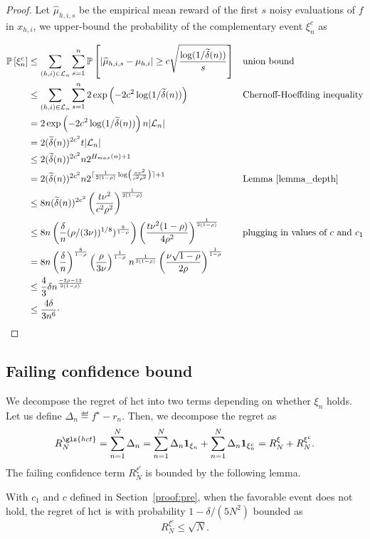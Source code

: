 \begin{proof}
Let $\hat{\mu}_{h,i,s}$ be the empirical mean reward of the first $s$ noisy evaluations of $f$ in $x_{h,i}$, we upper-bound the probability of the complementary event $\xi_n^c$ as

\begin{align*}
    \mathbb{P}\left[ \xi_n^c \right]
    & \leq \sum_{(h,i)\in\mathcal{L}_n}\sum_{s=1}^{n} \mathbb{P}\left[ |\widehat{\mu}_{h,i,s} - \mu_{h,i}| \geq c\sqrt{\frac{\log(1/\widetilde{\delta}(n))}{s}} \right] && \text{union bound} \\
    & \leq \sum_{(h,i)\in\mathcal{L}_n}\sum_{s=1}^{n} 2\operatorname{exp}\left( -2c^2\log(1/\widetilde{\delta}(n)) \right) && \text{Chernoff-Hoeffding inequality} \\
    & = 2\operatorname{exp}\left( -2c^2\log(1/\widetilde{\delta}(n)) \right) n|\mathcal{L}_n| \\
    & = 2(\widetilde{\delta}(n))^{2c^2}t|\mathcal{L}_n| \\
    & \leq 2(\widetilde{\delta}(n))^{2c^2}n 2^{H_{max}(n)+1} \\
    & = 2(\widetilde{\delta}(n))^{2c^2}n 2^{\lceil\frac{1}{2(1-\rho)}\log\left(\frac{n\nu^2}{c^2\rho^2} \right)\rceil+1} && \text{Lemma~\ref{lemma_depth}} \\
    & \leq 8n(\widetilde{\delta}(n))^{2c^2} \left( \frac{t\nu^2}{c^2\rho^2} \right)^{\frac{1}{2(1-\rho)}} \\
    & \leq 8n\left(\frac{\delta}{n} (\rho/(3\nu))^{1/8})^{\frac{8}{1-\rho}}\right) \left( \frac{t\nu^2(1-\rho)}{4\rho^2}\right)^{\frac{1}{2(1-\rho)}} && \text{plugging in values of $c$ and $c_1$} \\
    & = 8n\left(\frac{\delta}{n}\right)^{\frac{8}{1-\rho}} \left(\frac{\rho}{3\nu}\right)^{\frac{1}{1-\rho}} n^{\frac{1}{2(1-\rho)}} \left( \frac{\nu\sqrt{1-\rho}}{2\rho}\right)^{\frac{1}{1-\rho}} \\
    & \leq \frac{4}{3} \delta n^{\frac{-2\rho-13}{2(1-\rho)}} \\
    & \leq \frac{4\delta}{3n^6}\cdot
\end{align*}

\end{proof}

\subsection{Failing confidence bound}\label{proof:lemma_failing}

We decompose the regret of \gls{hct} into two terms depending on whether $\xi_n$ holds. Let us define $\Delta_n \eqdef f^\star - r_n$. Then, we decompose the regret as
\[
R_N^{\gls{hct}} = \sum_{n=1}^N \Delta_n = \sum_{n=1}^N \Delta_n \bOne_{\xi_n} + \sum_{n=1}^N \Delta_n \bOne_{\xi_n^c} = R_N^{\xi} + R_N^{\xi^c}.
\]
The failing confidence term $R_N^{\xi^c}$ is bounded by the following lemma.
\begin{lemma} \label{lemma_failing}
With $c_1$ and $c$ defined in Section~\ref{proof:pre}, when the favorable event does not hold, the regret of {\gls{hct}} is with probability $1-\delta/(5N^2)$ bounded as
\[
R_N^{\xi^c} \leq \sqrt{N}.
\]
\end{lemma}

